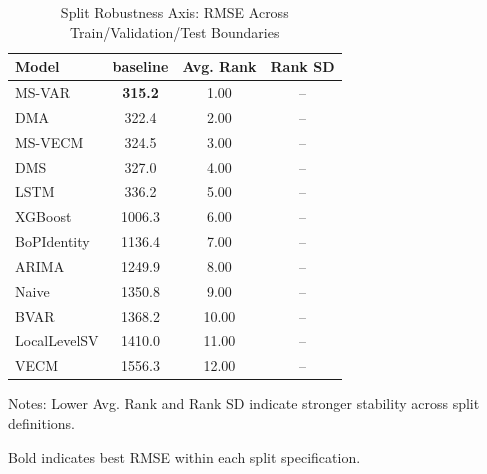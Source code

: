 \begin{table}[htbp]
\centering
\small
\caption{Split Robustness Axis: RMSE Across Train/Validation/Test Boundaries}
\label{tab:split_robustness}
\begin{tabular}{lccc}
\toprule
Model & baseline & Avg. Rank & Rank SD \\
\midrule
MS-VAR & \textbf{315.2} & 1.00 & -- \\
DMA & 322.4 & 2.00 & -- \\
MS-VECM & 324.5 & 3.00 & -- \\
DMS & 327.0 & 4.00 & -- \\
LSTM & 336.2 & 5.00 & -- \\
XGBoost & 1006.3 & 6.00 & -- \\
BoPIdentity & 1136.4 & 7.00 & -- \\
ARIMA & 1249.9 & 8.00 & -- \\
Naive & 1350.8 & 9.00 & -- \\
BVAR & 1368.2 & 10.00 & -- \\
LocalLevelSV & 1410.0 & 11.00 & -- \\
VECM & 1556.3 & 12.00 & -- \\
\bottomrule
\end{tabular}
\begin{tablenotes}
\small
\item Notes: Lower Avg. Rank and Rank SD indicate stronger stability across split definitions.
\item Bold indicates best RMSE within each split specification.
\end{tablenotes}
\end{table}